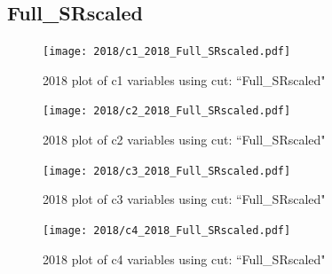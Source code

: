 \documentclass{article}
\begin{document}
      \subsection*{Full\_SRscaled}
                        \begin{figure}[H]
                            \centering
                            \caption{2018 plot of c1 variables using cut: ``Full\_SRscaled"}
                            \texttt{[image: 2018/c1\_2018\_Full\_SRscaled.pdf]}
                        \end{figure}    
                        \begin{figure}[H]
                            \centering
                            \caption{2018 plot of c2 variables using cut: ``Full\_SRscaled"}
                            \texttt{[image: 2018/c2\_2018\_Full\_SRscaled.pdf]}
                        \end{figure}    
                        \begin{figure}[H]
                            \centering
                            \caption{2018 plot of c3 variables using cut: ``Full\_SRscaled"}
                            \texttt{[image: 2018/c3\_2018\_Full\_SRscaled.pdf]}
                        \end{figure}    
                        \begin{figure}[H]
                            \centering
                            \caption{2018 plot of c4 variables using cut: ``Full\_SRscaled"}
                            \texttt{[image: 2018/c4\_2018\_Full\_SRscaled.pdf]}
                        \end{figure}    
\end{document}

